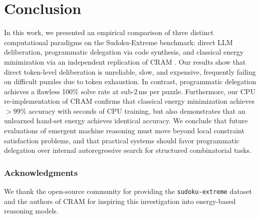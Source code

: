 \documentclass{article} %
\begin{document}
\section{Conclusion}
\label{sec:conclusion}

In this work, we presented an empirical comparison of three distinct computational paradigms on the Sudoku-Extreme benchmark: direct LLM deliberation, programmatic delegation via code synthesis, and classical energy minimization via an independent replication of CRAM \citep{hoover2026classical}. Our results show that direct token-level deliberation is unreliable, slow, and expensive, frequently failing on difficult puzzles due to token exhaustion. In contrast, programmatic delegation achieves a flawless 100\% solve rate at sub-2\,ms per puzzle. Furthermore, our CPU re-implementation of CRAM confirms that classical energy minimization achieves $>99\%$ accuracy with seconds of CPU training, but also demonstrates that an unlearned hand-set energy achieves identical accuracy. We conclude that future evaluations of emergent machine reasoning must move beyond local constraint satisfaction problems, and that practical systems should favor programmatic delegation over internal autoregressive search for structured combinatorial tasks.

\subsubsection*{Acknowledgments}
We thank the open-source community for providing the \texttt{sudoku-extreme} dataset and the authors of CRAM \citep{hoover2026classical} for inspiring this investigation into energy-based reasoning models.



\end{document}
